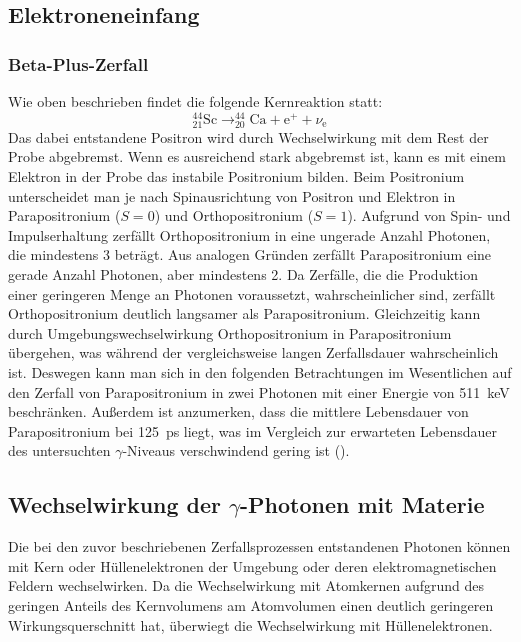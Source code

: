 \documentclass[
	a4paper,
	12pt,
	pagesize,
	ngerman
]{scrartcl}
\begin{document}
	\subsection{Elektroneneinfang}
	\subsubsection{Beta-Plus-Zerfall}
	Wie oben beschrieben findet die folgende Kernreaktion statt:
	\begin{equation}
		\label{eq_beta-plus}
		 _{21}^{44}\text{Sc} \rightarrow _{20}^{44}\text{Ca} + \text{e}^+ + \nu_{\text{e}}
	\end{equation}
	Das dabei entstandene Positron wird durch Wechselwirkung mit dem Rest der Probe abgebremst.
	Wenn es ausreichend stark abgebremst ist, kann es mit einem Elektron in der Probe das instabile Positronium bilden.
	Beim Positronium unterscheidet man je nach Spinausrichtung von Positron und Elektron in Parapositronium ($S=0$) und Orthopositronium ($S=1$).
	Aufgrund von Spin- und Impulserhaltung zerfällt Orthopositronium in eine ungerade Anzahl Photonen, die mindestens \num{3} beträgt.
	Aus analogen Gründen zerfällt Parapositronium eine gerade Anzahl Photonen, aber mindestens \num{2}.
	Da Zerfälle, die die Produktion einer geringeren Menge an Photonen voraussetzt, wahrscheinlicher sind, zerfällt Orthopositronium deutlich langsamer als Parapositronium.
	Gleichzeitig kann durch Umgebungswechselwirkung Orthopositronium in Parapositronium übergehen, was während der vergleichsweise langen Zerfallsdauer wahrscheinlich ist.
	Deswegen kann man sich in den folgenden Betrachtungen im Wesentlichen auf den Zerfall von Parapositronium in zwei Photonen mit einer Energie von \SI{511}{keV} beschränken.
	Außerdem ist anzumerken, dass die mittlere Lebensdauer von Parapositronium bei \SI{125}{ps} liegt, was im Vergleich zur erwarteten Lebensdauer des untersuchten $\gamma$-Niveaus verschwindend gering ist (\cite{Anleitung}).

	\subsection{Wechselwirkung der $\gamma$-Photonen mit Materie}

	Die bei den zuvor beschriebenen Zerfallsprozessen entstandenen Photonen können mit Kern oder Hüllenelektronen der Umgebung oder deren elektromagnetischen Feldern wechselwirken.
	Da die Wechselwirkung mit Atomkernen aufgrund des geringen Anteils des Kernvolumens am Atomvolumen einen deutlich geringeren Wirkungsquerschnitt hat, überwiegt die Wechselwirkung mit Hüllenelektronen.
\end{document}
